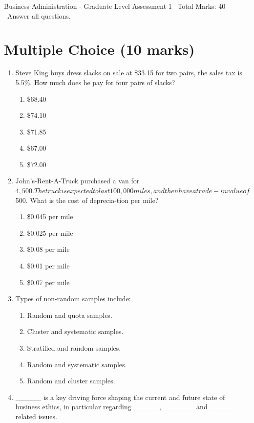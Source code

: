 \documentclass[12pt]{article}
\begin{document}
\begin{center}
Business Administration - Graduate Level Assessment 1 \
Total Marks: 40 \
Answer all questions.
\end{center}

\section*{Multiple Choice (10 marks)}
\begin{enumerate}[label=\arabic*.]
\item Steve King buys dress slacks on sale at \$33.15 for two pairs, the sales tax is 5.5\%. How much does he pay for four pairs of slacks?
\begin{enumerate}[label=(\alph*)]
    \item \$68.40
    \item \$74.10
    \item \$71.85
    \item \$67.00
    \item \$72.00
\end{enumerate}
\item John's-Rent-A-Truck purchased a van for $4,500. The truck isexpected to last 100,000 miles, and then have a trade-in valueof $500. What is the cost of deprecia-tion per mile?
\begin{enumerate}[label=(\alph*)]
    \item \$0.045 per mile
    \item \$0.025 per mile
    \item \$0.08 per mile
    \item \$0.01 per mile
    \item \$0.07 per mile
\end{enumerate}
\item Types of non-random samples include:
\begin{enumerate}[label=(\alph*)]
    \item Random and quota samples.
    \item Cluster and systematic samples.
    \item Stratified and random samples.
    \item Random and systematic samples.
    \item Random and cluster samples.
\end{enumerate}
\item \_\_\_\_\_ is a key driving force shaping the current and future state of business ethics, in particular regarding \_\_\_\_\_, \_\_\_\_\_\_ and \_\_\_\_\_ related issues.

\end{enumerate}
\end{document}
